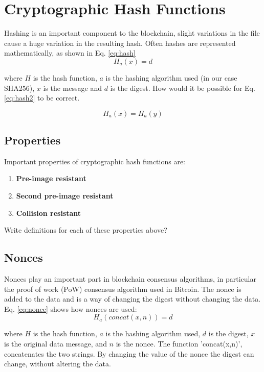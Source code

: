 \section{Cryptographic Hash Functions}
Hashing is an important component to the blockchain, slight variations in the file cause a huge variation in the resulting hash. Often hashes are represented mathematically, as shown in Eq. \ref{eq:hash}
\begin{equation}\label{eq:hash}
	H_{a}(x) = d
\end{equation}

where $H$ is the hash function, $a$ is the hashing algorithm used (in our case SHA256), $x$ is the message and $d$ is the digest. How would it be possible for Eq. \ref{eq:hash2} to be correct.

\begin{equation}\label{eq:hash2}
	H_{a}(x) = H_{a}(y)
\end{equation}

\pagebreak
\subsection{Properties}
Important properties of cryptographic hash functions are:
\begin{enumerate}
	\item {\bf Pre-image resistant}
	\item {\bf Second pre-image resistant}
	\item {\bf Collision resistant}
\end{enumerate}

Write definitions for each of these properties above?
	
\subsection{Nonces}
Nonces play an important part in blockchain consensus algorithms, in particular the proof of work (PoW) consensus algorithm used in Bitcoin. The nonce is added to the data and is a way of changing the digest without changing the data. Eq. \ref{eq:nonce} shows how nonces are used:
\begin{equation}\label{eq:nonce}
	H_{a}(concat(x,n))=d
\end{equation}


where $H$ is the hash function, $a$ is the hashing algorithm used, $d$ is the digest, $x$ is the original data message, and $n$ is the nonce. The function 'concat(x,n)', concatenates the two strings. By changing the value of the nonce the digest can change, without altering the data.


